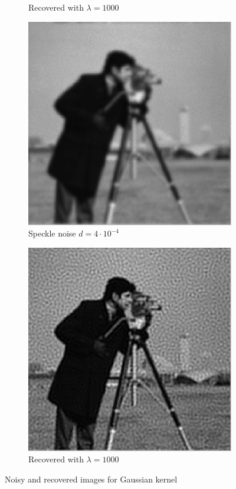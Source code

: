 \documentclass[a4paper, 10pt, conference] {article}
\begin{document}
\begin{figure}[H]
\begin{subfigure}{0.49\textwidth}
		\caption{Recovered with $\lambda = 1000$}
	\end{subfigure}
	\begin{subfigure}{0.49\textwidth} 
		\centering						
		\includegraphics[scale=0.48]{gaussian/noisy/speckle0004.PNG}
		\caption{Speckle noise $d =4\cdot 10^{-4}$}
	\end{subfigure}
	\begin{subfigure}{0.49\textwidth} 
		\centering						
		\includegraphics[scale=0.48]{gaussian/noisy/recovered_speckle0004.PNG}
		\caption{Recovered with $\lambda = 1000$}
	\end{subfigure}
	\caption{Noisy and recovered images for Gaussian kernel}
	\label{noisy1}
\end{figure}
\end{document}
